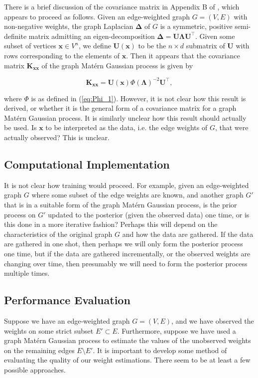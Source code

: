There is a brief discussion of the covariance matrix in Appendix B of \cite{pmlr-v130-borovitskiy21a}, which appears to proceed as follows. Given an edge-weighted graph $G = (V, E)$ with non-negative weights, the graph Laplacian $\bm \Delta$ of $G$ is a symmetric, positive semi-definite matrix admitting an eigen-decomposition $\bm \Delta = \mathbf U \bm \Lambda \mathbf U^\intercal$. Given some subset of vertices $\bm x \in V^n$, we define $\mathbf U(\bm x)$ to be the $n \times d$ submatrix of $\mathbf U$ with rows corresponding to the elements of $\bm x$. Then it appears that the covariance matrix $\mathbf K_{\bm {xx}}$ of the graph Mat\'{e}rn Gaussian process is given by

\[
    \mathbf K_{\bm{xx}} = \mathbf U(\bm x)\Phi(\bm \Lambda)^{-2} \mathbf U^\intercal,
\]

where $\Phi$ is as defined in (\ref{eq:Phi_1}). However, it is not clear how this result is derived, or whether it is the general form of a covariance matrix for a graph Mat\'{e}rn Gaussian process. It is similarly unclear how this result should actually be used. Is $\bm x$ to be interpreted as the data, i.e. the edge weights of $G$, that were actually observed? This is unclear.

\subsection{Computational Implementation}\label{sec:comp_implem}

It is not clear how training would proceed. For example, given an edge-weighted graph $G$ where some subset of the edge weights are known, and another graph $G'$ that is in a suitable form of the graph Mat\'{e}rn Gaussian process, is the prior process on $G'$ updated to the posterior (given the observed data) one time, or is this done in a more iterative fashion? Perhaps this will depend on the characteristics of the original graph $G$ and how the data are gathered. If the data are gathered in one shot, then perhaps we will only form the posterior process one time, but if the data are gathered incrementally, or the observed weights are changing over time, then presumably we will need to form the posterior process multiple times.

\subsection{Performance Evaluation}

Suppose we have an edge-weighted graph $G = (V, E)$, and we have observed the weights on some strict subset $E' \subset E$. Furthermore, suppose we have used a graph Mat\'{e}rn Gaussian process to estimate the values of the unobserved weights on the remaining edges $E \setminus E'$. It is important to develop some method of evaluating the quality of our weight estimations. There seem to be at least a few possible approaches.

